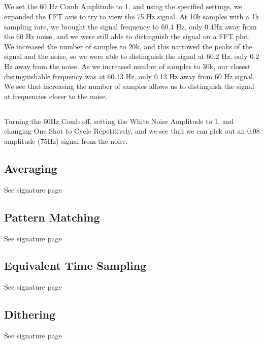 \documentclass{article}
\begin{document}
\subsection{}
    We set the 60 Hz Comb Amplitude to 1, and using the specified settings, we expanded the FFT axis to try to view the 75 Hz signal. At 10k samples with a 1k sampling rate, we brought the signal frequency to 60.4 Hz, only 0.4Hz away from the 60 Hz noise, and we were still able to distinguish the signal on a FFT plot. \\\indent We increased the number of samples to 20k, and this narrowed the peaks of the signal and the noise, so we were able to distinguish the signal at 60.2 Hz, only 0.2 Hz away from the noise. As we increased number of samples to 30k, our closest distinguishable frequency was at 60.13 Hz, only 0.13 Hz away from 60 Hz signal. We see that increasing the number of samples allows us to distinguish the signal at frequencies closer to the noise.
     
\subsection{}
    Turning the 60Hz Comb off, setting the White Noise Amplitude to 1, and changing One Shot to Cycle Repetitively, and we see that we can pick out an 0.08 amplitude (75Hz) signal from the noise.
    
\subsection{Averaging}
    See signature page

\subsection{Pattern Matching}
    See signature page

\subsection{Equivalent Time Sampling}
    See signature page

\subsection{Dithering}
    See signature page

\end{document}
